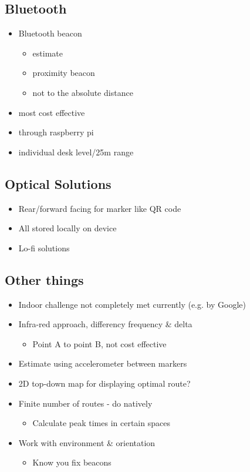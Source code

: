 \subsection*{Bluetooth}
\begin{itemize}
	\item Bluetooth beacon
		\begin{itemize}
			\item estimate
			\item proximity beacon
			\item not to the absolute distance
		\end{itemize}
	\item most cost effective
	\item through raspberry pi
	\item individual desk level/25m range
\end{itemize}

\subsection*{Optical Solutions}
\begin{itemize}
	\item Rear/forward facing for marker like QR code
	\item All stored locally on device
	\item Lo-fi solutions
\end{itemize}

\subsection*{Other things}
\begin{itemize}
	\item Indoor challenge not completely met currently (e.g. by Google)
	\item Infra-red approach, differency frequency \& delta
		\begin{itemize}
		\item Point A to point B, not cost effective
		\end{itemize}
	\item Estimate using accelerometer between markers
	\item 2D top-down map for displaying optimal route?
	\item Finite number of routes - do natively
		\begin{itemize}
			\item Calculate peak times in certain spaces
		\end{itemize}
	\item Work with environment \& orientation
		\begin{itemize}
			\item Know you fix beacons
		\end{itemize}
\end{itemize}

